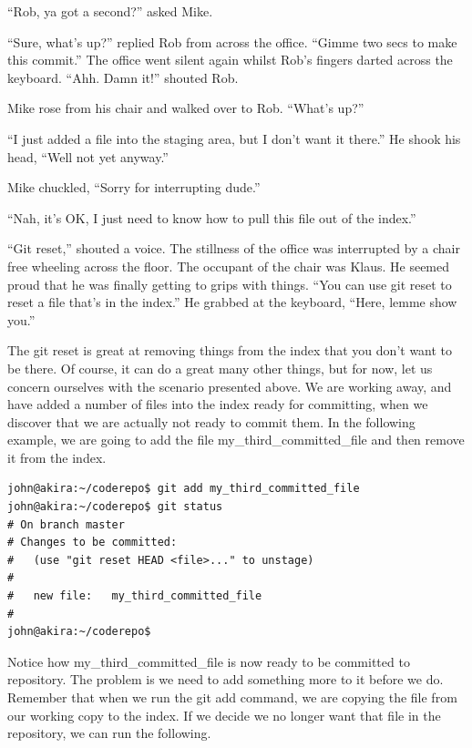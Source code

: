 \begin{trenches}
``Rob, ya got a second?'' asked Mike.

``Sure, what's up?'' replied Rob from across the office.  ``Gimme two secs to make this commit.''  The office went silent again whilst Rob's fingers darted across the keyboard.  ``Ahh.  Damn it!'' shouted Rob.  

Mike rose from his chair and walked over to Rob.  ``What's up?''

``I just added a file into the staging area, but I don't want it there.''  He shook his head, ``Well not yet anyway.''

Mike chuckled, ``Sorry for interrupting dude.''

``Nah, it's OK, I just need to know how to pull this file out of the index.''

``Git reset,'' shouted a voice.  The stillness of the office was interrupted by a chair free wheeling across the floor.  The occupant of the chair was Klaus.  He seemed proud that he was finally getting to grips with things.  ``You can use git reset to reset a file that's in the index.''  He grabbed at the keyboard, ``Here, lemme show you.''
\end{trenches}

The git reset is great at removing things from the index that you don't want to be there.  Of course, it can do a great many other things, but for now, let us concern ourselves with the scenario presented above.  We are working away, and have added a number of files into the index ready for committing, when we discover that we are actually not ready to commit them.  In the following example, we are going to add the file my\_third\_committed\_file and then remove it from the index.

\begin{Verbatim}[frame=leftline,framerule=1mm,fontsize=\relsize{-3}] 
john@akira:~/coderepo$ git add my_third_committed_file
john@akira:~/coderepo$ git status
# On branch master
# Changes to be committed:
#   (use "git reset HEAD <file>..." to unstage)
#
#	new file:   my_third_committed_file
#
john@akira:~/coderepo$ 
\end{Verbatim} 

Notice how my\_third\_committed\_file is now ready to be committed to repository.  The problem is we need to add something more to it before we do.  Remember that when we run the git add command, we are copying the file from our working copy to the index.  If we decide we no longer want that file in the repository, we can run the following.  

